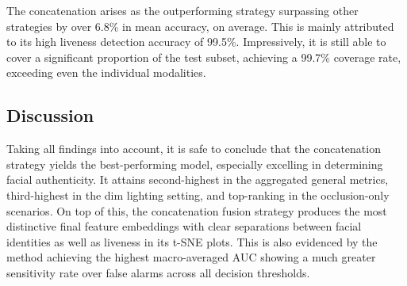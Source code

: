 \documentclass{mpaper}
\begin{document}
\begin{table}[h!]
    \centering
    \vspace{-0.4cm}
    \vspace{0.1cm}
    \caption{Averaged accuracy and $F_{0.5}$ score for the seven fusion strategies and individual modalities, isolated on the \textbf{occlusion} scenarios. Equal weighting is applied to subject and liveness predictions.}
    \label{tab:occlusion_averaged_acc_fb}
    \vspace{-0.5cm}
\end{table}

The concatenation arises as the outperforming strategy surpassing other strategies by over 6.8\% in mean accuracy, on average. This is mainly attributed to its high liveness detection accuracy of 99.5\%. Impressively, it is still able to cover a significant proportion of the test subset, achieving a 99.7\% coverage rate, exceeding even the individual modalities. 


\subsection{Discussion}
Taking all findings into account, it is safe to conclude that the concatenation strategy yields the best-performing model, especially excelling in determining facial authenticity. It attains second-highest in the aggregated general metrics, third-highest in the dim lighting setting, and top-ranking in the occlusion-only scenarios. On top of this, the concatenation fusion strategy produces the most distinctive final feature embeddings with clear separations between facial identities as well as liveness in its t-SNE plots. This is also evidenced by the method achieving the highest macro-averaged AUC showing a much greater sensitivity rate over false alarms across all decision thresholds. 
\end{document}
